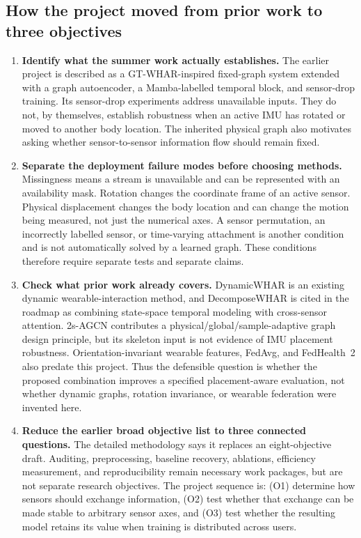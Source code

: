\documentclass[10pt,a4paper]{article}
\begin{document}
\subsection{How the project moved from prior work to three objectives}
\begin{enumerate}
\item \textbf{Identify what the summer work actually establishes.} The earlier project is described as a GT-WHAR-inspired fixed-graph system extended with a graph autoencoder, a Mamba-labelled temporal block, and sensor-drop training. Its sensor-drop experiments address unavailable inputs. They do not, by themselves, establish robustness when an active IMU has rotated or moved to another body location. The inherited physical graph also motivates asking whether sensor-to-sensor information flow should remain fixed.
\item \textbf{Separate the deployment failure modes before choosing methods.} Missingness means a stream is unavailable and can be represented with an availability mask. Rotation changes the coordinate frame of an active sensor. Physical displacement changes the body location and can change the motion being measured, not just the numerical axes. A sensor permutation, an incorrectly labelled sensor, or time-varying attachment is another condition and is not automatically solved by a learned graph. These conditions therefore require separate tests and separate claims.
\item \textbf{Check what prior work already covers.} DynamicWHAR is an existing dynamic wearable-interaction method, and DecomposeWHAR is cited in the roadmap as combining state-space temporal modeling with cross-sensor attention. 2s-AGCN contributes a physical/global/sample-adaptive graph design principle, but its skeleton input is not evidence of IMU placement robustness. Orientation-invariant wearable features, FedAvg, and FedHealth~2 also predate this project. Thus the defensible question is whether the proposed combination improves a specified placement-aware evaluation, not whether dynamic graphs, rotation invariance, or wearable federation were invented here.
\item \textbf{Reduce the earlier broad objective list to three connected questions.} The detailed methodology says it replaces an eight-objective draft. Auditing, preprocessing, baseline recovery, ablations, efficiency measurement, and reproducibility remain necessary work packages, but are not separate research objectives. The project sequence is: (O1) determine how sensors should exchange information, (O2) test whether that exchange can be made stable to arbitrary sensor axes, and (O3) test whether the resulting model retains its value when training is distributed across users.

\end{enumerate}
\end{document}
